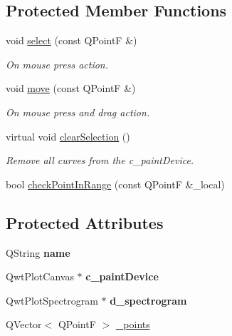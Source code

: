 \subsection*{Protected Member Functions}
\begin{DoxyCompactItemize}
\item 
\mbox{\label{classPointerTool_a976caf364c090420e3b21b7b029f6f13}} 
void \mbox{\hyperlink{classPointerTool_a976caf364c090420e3b21b7b029f6f13}{select}} (const Q\+PointF \&)
\begin{DoxyCompactList}\small\item\em On mouse press action. \end{DoxyCompactList}\item 
\mbox{\label{classPointerTool_a56e94e4962b110df07eb8925131e2c0e}} 
void \mbox{\hyperlink{classPointerTool_a56e94e4962b110df07eb8925131e2c0e}{move}} (const Q\+PointF \&)
\begin{DoxyCompactList}\small\item\em On mouse press and drag action. \end{DoxyCompactList}\item 
\mbox{\label{classTool_a11f1da4092d196a7b91d3d60276586eb}} 
virtual void \mbox{\hyperlink{classTool_a11f1da4092d196a7b91d3d60276586eb}{clear\+Selection}} ()
\begin{DoxyCompactList}\small\item\em Remove all curves from the c\+\_\+paint\+Device. \end{DoxyCompactList}\item 
bool \mbox{\hyperlink{classTool_a81244366dc1b9f55465ed6f37b81033c}{check\+Point\+In\+Range}} (const Q\+PointF \&\+\_\+local)
\end{DoxyCompactItemize}
\subsection*{Protected Attributes}
\begin{DoxyCompactItemize}
\item 
\mbox{\label{classTool_af0935d8e8edd73d8ec85424b5b15196b}} 
Q\+String {\bfseries name}
\item 
\mbox{\label{classTool_a1e301a03c5806c900786760d80049380}} 
Qwt\+Plot\+Canvas $\ast$ {\bfseries c\+\_\+paint\+Device}
\item 
\mbox{\label{classTool_af1d11cc5374ba7eb7c1d41cfb5d4e981}} 
Qwt\+Plot\+Spectrogram $\ast$ {\bfseries d\+\_\+spectrogram}
\item 
Q\+Vector$<$ Q\+PointF $>$ \mbox{\hyperlink{classTool_a68be77a2e364a7b13d7206388ba5843e}{\+\_\+points}}
\end{DoxyCompactItemize}


